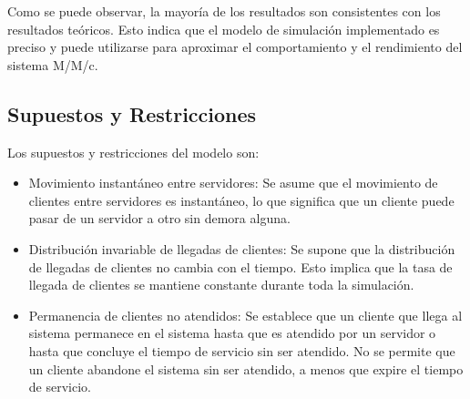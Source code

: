 \documentclass[11pt]{article}
\begin{document}
    Como se puede observar, la mayoría de los resultados son consistentes con los resultados teóricos. Esto indica que el modelo
    de simulación implementado es preciso y puede utilizarse para aproximar el comportamiento y el rendimiento del sistema M/M/c.


    \subsection{Supuestos y Restricciones}
    Los supuestos y restricciones del modelo son:
    \begin{itemize}
       \item Movimiento instantáneo entre servidores: Se asume que el movimiento de clientes entre servidores es instantáneo, lo que significa que un cliente puede pasar de un servidor a otro sin demora alguna.

\item Distribución invariable de llegadas de clientes: Se supone que la distribución de llegadas de clientes no cambia con el tiempo. Esto implica que la tasa de llegada de clientes se mantiene constante durante toda la simulación.

\item Permanencia de clientes no atendidos: Se establece que un cliente que llega al sistema permanece en el sistema hasta que es atendido por un servidor o hasta que concluye el tiempo de servicio sin ser atendido. No se permite que un cliente abandone el sistema sin ser atendido, a menos que expire el tiempo de servicio.


    \end{itemize}
\end{document}
